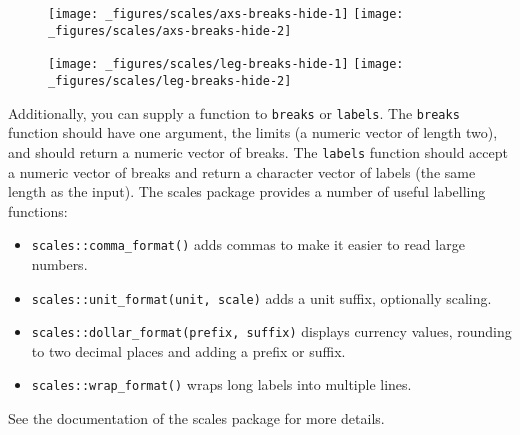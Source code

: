 \begin{figure}[H]
  \texttt{[image: \_figures/scales/axs-breaks-hide-1]}%
  \texttt{[image: \_figures/scales/axs-breaks-hide-2]}
\end{figure}

\begin{Shaded}
\begin{Highlighting}[]
\OperatorTok{+}\StringTok{ }\NormalTok{(} \NormalTok{)}
\OperatorTok{+}\StringTok{ }\NormalTok{(} \NormalTok{)}
\end{Highlighting}
\end{Shaded}

\begin{figure}[H]
  \texttt{[image: \_figures/scales/leg-breaks-hide-1]}%
  \texttt{[image: \_figures/scales/leg-breaks-hide-2]}
\end{figure}

Additionally, you can supply a function to \texttt{breaks} or
\texttt{labels}. The \texttt{breaks} function should have one argument,
the limits (a numeric vector of length two), and should return a numeric
vector of breaks. The \texttt{labels} function should accept a numeric
vector of breaks and return a character vector of labels (the same
length as the input). The scales package provides a number of useful
labelling functions:

\begin{itemize}
\item
  \texttt{scales::comma\_format()} adds commas to make it easier to read
  large numbers.
\item
  \texttt{scales::unit\_format(unit,\ scale)} adds a unit suffix,
  optionally scaling.
\item
  \texttt{scales::dollar\_format(prefix,\ suffix)} displays currency
  values, rounding to two decimal places and adding a prefix or suffix.
\item
  \texttt{scales::wrap\_format()} wraps long labels into multiple lines.
\end{itemize}

See the documentation of the scales package for more details.

